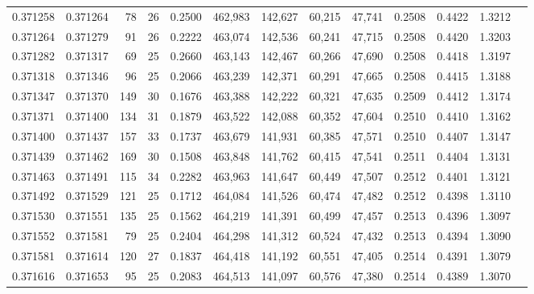 \begin{tabular}{rrrrrrrrrrrrr}
0.371258 & 0.371264 &    78 &  26 &                                     0.2500 & 462,983 & 142,627 &  60,215 &  47,741 & 0.2508 & 0.4422 & 1.3212 \\
0.371264 & 0.371279 &    91 &  26 &                                     0.2222 & 463,074 & 142,536 &  60,241 &  47,715 & 0.2508 & 0.4420 & 1.3203 \\
0.371282 & 0.371317 &    69 &  25 &                                     0.2660 & 463,143 & 142,467 &  60,266 &  47,690 & 0.2508 & 0.4418 & 1.3197 \\
0.371318 & 0.371346 &    96 &  25 &                                     0.2066 & 463,239 & 142,371 &  60,291 &  47,665 & 0.2508 & 0.4415 & 1.3188 \\
0.371347 & 0.371370 &   149 &  30 &                                     0.1676 & 463,388 & 142,222 &  60,321 &  47,635 & 0.2509 & 0.4412 & 1.3174 \\
0.371371 & 0.371400 &   134 &  31 &                                     0.1879 & 463,522 & 142,088 &  60,352 &  47,604 & 0.2510 & 0.4410 & 1.3162 \\
0.371400 & 0.371437 &   157 &  33 &                                     0.1737 & 463,679 & 141,931 &  60,385 &  47,571 & 0.2510 & 0.4407 & 1.3147 \\
0.371439 & 0.371462 &   169 &  30 &                                     0.1508 & 463,848 & 141,762 &  60,415 &  47,541 & 0.2511 & 0.4404 & 1.3131 \\
0.371463 & 0.371491 &   115 &  34 &                                     0.2282 & 463,963 & 141,647 &  60,449 &  47,507 & 0.2512 & 0.4401 & 1.3121 \\
0.371492 & 0.371529 &   121 &  25 &                                     0.1712 & 464,084 & 141,526 &  60,474 &  47,482 & 0.2512 & 0.4398 & 1.3110 \\
0.371530 & 0.371551 &   135 &  25 &                                     0.1562 & 464,219 & 141,391 &  60,499 &  47,457 & 0.2513 & 0.4396 & 1.3097 \\
0.371552 & 0.371581 &    79 &  25 &                                     0.2404 & 464,298 & 141,312 &  60,524 &  47,432 & 0.2513 & 0.4394 & 1.3090 \\
0.371581 & 0.371614 &   120 &  27 &                                     0.1837 & 464,418 & 141,192 &  60,551 &  47,405 & 0.2514 & 0.4391 & 1.3079 \\
0.371616 & 0.371653 &    95 &  25 &                                     0.2083 & 464,513 & 141,097 &  60,576 &  47,380 & 0.2514 & 0.4389 & 1.3070 \\

\end{tabular}
